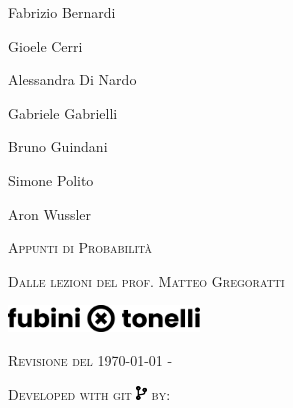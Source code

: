 \pagestyle{empty} %

\hspace{0.7cm}
{\large Fabrizio Bernardi \par}
\vspace{-0.2cm}
\hspace{0.7cm}
{\large Gioele Cerri \par}
\vspace{-0.2cm}
\hspace{0.7cm}
{\large Alessandra Di Nardo \par}
\vspace{-0.2cm}
\hspace{0.7cm}
{\large Gabriele Gabrielli \par}
\vspace{-0.2cm}
\hspace{0.7cm}
{\large Bruno Guindani \par}
\vspace{-0.2cm}
\hspace{0.7cm}
{\large Simone Polito \par}
\vspace{-0.2cm}
\hspace{0.7cm}
{\large Aron Wussler \par}


\vspace{0.8cm}
\hspace{0.7cm}
{\textsc{\Huge Appunti di Probabilità}}

\hspace{0.7cm}
{\scshape\large Dalle lezioni del prof. Matteo Gregoratti \par}

\begin{center}
  {
  \includegraphics[width=0.38\textwidth]{img/Logo_s.png}}
\end{center}

\clearpage
{}



\textsc{Revisione del \today}
{- \texttt{}}
{}

\textsc{Developed with git \includegraphics[height=1em]{img/icons/code.pdf} by:}

